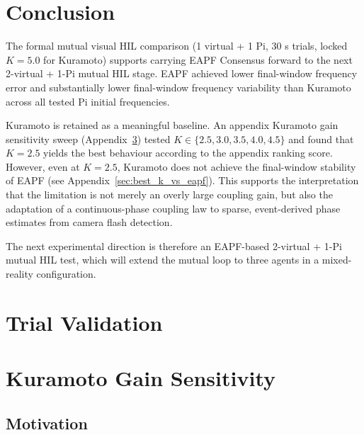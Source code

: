 \documentclass[11pt,a4paper]{article}
\newcommand{\tabledir}{tables}
\begin{document}
\section{Conclusion}

The formal mutual visual HIL comparison (1 virtual + 1 Pi, 30 s trials,
locked $K=5.0$ for Kuramoto) supports carrying EAPF Consensus forward to the
next 2-virtual + 1-Pi mutual HIL stage. EAPF achieved lower final-window
frequency error and substantially lower final-window frequency variability
than Kuramoto across all tested Pi initial frequencies.

Kuramoto is retained as a meaningful baseline. An appendix Kuramoto gain
sensitivity sweep (Appendix~\ref{sec:k_sensitivity}) tested $K \in \{2.5,
3.0, 3.5, 4.0, 4.5\}$ and found that $K=2.5$ yields the best behaviour
according to the appendix ranking score. However, even at $K=2.5$, Kuramoto
does not achieve the final-window stability of EAPF (see
Appendix~\ref{sec:best_k_vs_eapf}). This supports the interpretation that the
limitation is not merely an overly large coupling gain, but also the
adaptation of a continuous-phase coupling law to sparse, event-derived phase
estimates from camera flash detection.

The next experimental direction is therefore an EAPF-based 2-virtual + 1-Pi
mutual HIL test, which will extend the mutual loop to three agents in a
mixed-reality configuration.

\appendix
\section{Trial Validation}
\label{sec:appendix_validation}

\begingroup
\scriptsize

\endgroup

\section{Kuramoto Gain Sensitivity}
\label{sec:k_sensitivity}

\subsection{Motivation}
\end{document}
